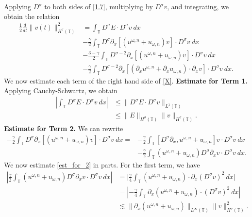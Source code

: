 \documentclass[12pt,reqno]{amsart}
\newcommand{\p}{\partial}
\newcommand{\ci}{\mathbb{T}}
\theoremstyle{plain}  %
\theoremstyle{definition}
\begin{document}
Applying $D^\sigma$ to both sides of \eqref{1.7}, multiplying by
$D^\sigma v$, and integrating, we obtain the
relation
\begin{equation}
	\begin{split}
		\frac{1}{2}\frac{d}{dt}\|v(t)\|_{H^\sigma(\ci)}^2
		& = \int_{\ci} D^\sigma E \cdot D^\sigma
		v \ dx
		\\
		& - \frac{\gamma}{2}\int_{\ci} D^\sigma
		\p_x \left[ \left( u^{\omega,n} + u_{\omega,n} \right)v
		\right]\cdot D^\sigma v \ dx
		\\
		& - \frac{3-\gamma}{2}\int_{\ci} D^{\sigma
		-2} \p_x \left[ \left( u^{\omega,n} + u_{\omega,n}
		\right)v \right] \cdot D^\sigma v \ dx
		\\
		& - \frac{\gamma}{2}\int_{\ci} D^{\sigma
		-2}
		\p_x \left[ \left( \p_x u^{\omega,n} + \p_x u_{\omega,n}
		\right)\cdot \p_x v \right] \cdot
		D^\sigma v \ dx.
		\label{X}
	\end{split}
\end{equation}
We now estimate each term of the right hand side
of \eqref{X}.
\vskip0.1in
{\bf Estimate for Term 1.} Applying Cauchy-Schwartz, we obtain
\begin{equation}
	\begin{split}
	\left |\int_{\ci} D^\sigma E \cdot D^\sigma v \ dx \right |
		& \le \|D^\sigma E \cdot D^\sigma v \|_{L^1(\ci)}
		\\
		& \le \|E\|_{H^\sigma(\ci)} \|v\|_{H^\sigma(\ci)}.
		\label{est_for_1}
	\end{split}
\end{equation}
%
{\bf Estimate for Term 2.} We can rewrite
\begin{equation}
	\begin{split}
		-\frac{\gamma}{2} \int_{\ci} D^\sigma \p_x \left[ \left( u^{\omega,n} + u_{\omega,n}
		\right)v \right] \cdot D^\sigma v \ dx
		 = & -\frac{\gamma}{2}\int_{\ci} \left[ D^\sigma \p_x , u^{\omega,n} + u_{\omega,n}
		\right]v \cdot D^\sigma v \ dx
		\\
		& - \frac{\gamma}{2} \int_{\ci} (u^{\omega,n} + u_{\omega,n})
		D^\sigma \p_x v \cdot
		D^\sigma v \ dx.
		\label{est_for_2}
	\end{split}
\end{equation}
We now estimate \eqref{est_for_2} in parts. For the first term, we have
\begin{equation}
	\begin{split}
		\left | \frac{\gamma}{2} \int_{\ci} (u^{\omega,n} + u_{\omega,n})
		D^\sigma \p_x v \cdot
		D^\sigma v \ dx \right |
		& = \bigg | \frac{\gamma}{4}\int_{\ci} (u^{\omega,n} +
		u_{\omega,n}) \cdot \p_x (D^\sigma v)^2 \ dx \bigg |
		\\
		& = \left | -\frac{\gamma}{4} \int_{\ci} \p_x(u^{\omega,n} + u_{\omega,n}) \cdot
		(D^\sigma v)^2  \ dx \right |
		\\
		& \lesssim \|\p_x(u^{\omega,n} + u_{\omega,n}) \|_{L^\infty(\ci)}
		\|v\|_{H^\sigma(\ci)}^2.
		\label{2'}
	\end{split}
\end{equation}
\end{document}
